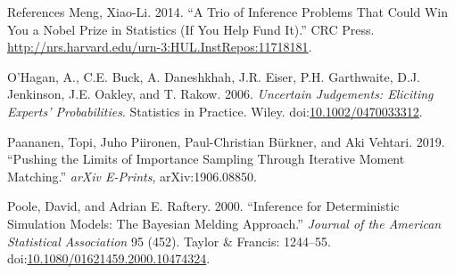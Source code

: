 \documentclass[10pt,ignorenonframetext,]{beamer}
\begin{document}
\begin{frame}[allowframebreaks]{References}
\hypertarget{ref-meng:14}{}
Meng, Xiao-Li. 2014. ``A Trio of Inference Problems That Could Win You a
Nobel Prize in Statistics (If You Help Fund It).'' CRC Press.
\url{http://nrs.harvard.edu/urn-3:HUL.InstRepos:11718181}.

\hypertarget{ref-ohagan:etal:06}{}
O'Hagan, A., C.E. Buck, A. Daneshkhah, J.R. Eiser, P.H. Garthwaite, D.J.
Jenkinson, J.E. Oakley, and T. Rakow. 2006. \emph{Uncertain Judgements:
Eliciting Experts' Probabilities}. Statistics in Practice. Wiley.
doi:\href{https://doi.org/10.1002/0470033312}{10.1002/0470033312}.

\hypertarget{ref-paananen:etal:19}{}
Paananen, Topi, Juho Piironen, Paul-Christian Bürkner, and Aki Vehtari.
2019. ``Pushing the Limits of Importance Sampling Through Iterative
Moment Matching.'' \emph{arXiv E-Prints}, arXiv:1906.08850.

\hypertarget{ref-poole:raftery:00}{}
Poole, David, and Adrian E. Raftery. 2000. ``Inference for Deterministic
Simulation Models: The Bayesian Melding Approach.'' \emph{Journal of the
American Statistical Association} 95 (452). Taylor \& Francis: 1244--55.
doi:\href{https://doi.org/10.1080/01621459.2000.10474324}{10.1080/01621459.2000.10474324}.

\end{frame}
\end{document}
